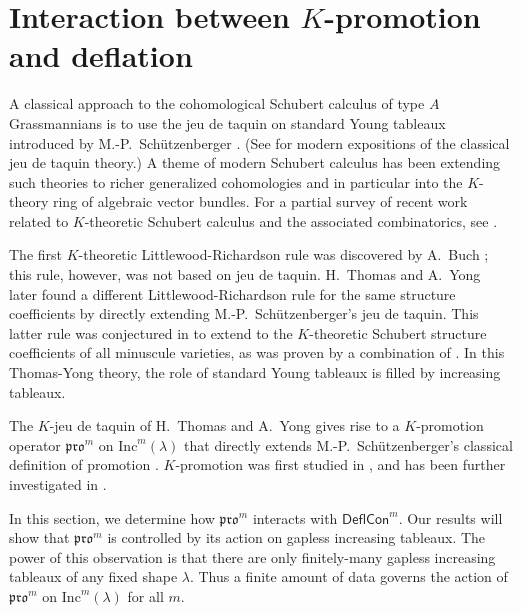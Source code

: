 \documentclass[12pt]{amsart}
\theoremstyle{definition}
\theoremstyle{remark}
\numberwithin{equation}{section}
\newcommand{\inc}{\ensuremath{\mathrm{Inc}}}
\newcommand{\pro}{\mathfrak{pro}}
\newcommand{\compress}{\ensuremath{\mathsf{DeflCon}}}
\begin{document}
\section{Interaction between $K$-promotion and deflation}\label{sec:interaction}
A classical approach to the cohomological Schubert calculus of type $A$ Grassmannians is to use the jeu de taquin on standard Young tableaux introduced by M.-P.~Sch\"utzenberger \cite{Schutzenberger:jdt}. (See \cite{Fulton, Manivel} for modern expositions of the classical jeu de taquin theory.) A theme of modern Schubert calculus has been extending such theories to richer generalized cohomologies and in particular into the $K$-theory ring of algebraic vector bundles. For a partial survey of recent work related to $K$-theoretic Schubert calculus and the associated combinatorics, see \cite{Pechenik.Yong:genomic}.

The first $K$-theoretic Littlewood-Richardson rule was discovered by A.~Buch \cite{Buch}; this rule, however, was not based on jeu de taquin. H.~Thomas and A.~Yong \cite{Thomas.Yong:K} later found a different Littlewood-Richardson rule for the same structure coefficients by directly extending M.-P.~Sch\"utzenberger's jeu de taquin. This latter rule was conjectured in \cite{Thomas.Yong:K} to extend to the $K$-theoretic Schubert structure coefficients of all minuscule varieties, as was proven by a combination of \cite{Buch.Ravikumar,Clifford.Thomas.Yong,Buch.Samuel}. In this Thomas-Yong theory, the role of standard Young tableaux is filled by increasing tableaux.

The $K$-jeu de taquin of H.~Thomas and A.~Yong \cite{Thomas.Yong:K} gives rise to a $K$-promotion operator $\pro^m$ on $\inc^m(\lambda)$ that directly extends M.-P.~Sch\"utzenberger's classical definition of promotion \cite{Schutzenberger:promotion}. $K$-promotion was first studied in \cite{Pechenik}, and has been further investigated in \cite{BPS, Pressey.Stokke.Visentin, Rhoades:skein, DPS, Pechenik:frames,Vorland}. 

In this section, we determine how $\pro^m$ interacts with $\compress^m$. Our results will show that $\pro^m$ is controlled by its action on gapless increasing tableaux. The power of this observation is that there are only finitely-many gapless increasing tableaux of any fixed shape $\lambda$. Thus a finite amount of data governs the action of $\pro^m$ on $\inc^m(\lambda)$ for all $m$.
\end{document}
